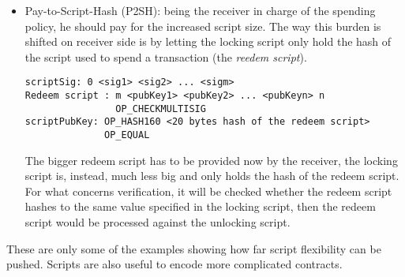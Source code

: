 \begin{itemize}[leftmargin=*]
\item Pay-to-Script-Hash (P2SH): being the receiver in charge of the spending policy, he should pay for the increased script size. The way this burden is shifted on receiver side is by letting the locking script only hold the hash of the script used to spend a transaction (the \textit{reedem script}).
\begin{lstlisting}[frame=single]
scriptSig: 0 <sig1> <sig2> ... <sigm>
Redeem script : m <pubKey1> <pubKey2> ... <pubKeyn> n 
                OP_CHECKMULTISIG 
scriptPubKey: OP_HASH160 <20 bytes hash of the redeem script> 
              OP_EQUAL
\end{lstlisting}
The bigger redeem script has to be provided now by the receiver, the locking script is, instead, much less big and only holds the hash of the redeem script. For what concerns verification, it will be checked whether the redeem script hashes to the same value specified in the locking script, then the redeem script would be processed against the unlocking script.
\end{itemize}
These are only some of the examples showing how far script flexibility can be pushed. Scripts are also useful to encode more complicated contracts.
